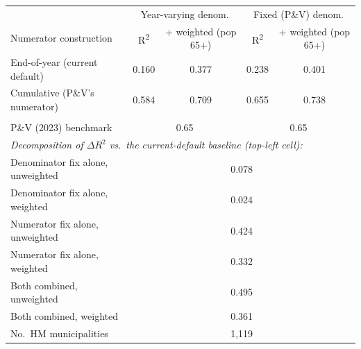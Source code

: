 \begin{tabular}{lcccc} \hline \hline
& \multicolumn{2}{c}{Year-varying denom.} & \multicolumn{2}{c}{Fixed (P\&V) denom.} \\
Numerator construction & R\textsuperscript{2} & + weighted (pop 65+) & R\textsuperscript{2} & + weighted (pop 65+) \\ \toprule
End-of-year (current default) & 0.160 & 0.377 & 0.238 & 0.401 \\ 
Cumulative (P\&V's numerator) & 0.584 & 0.709 & 0.655 & 0.738 \\ 
  & & & & \\ 
P\&V (2023) benchmark & \multicolumn{2}{c}{0.65} & \multicolumn{2}{c}{0.65} \\ 
\bottomrule
\multicolumn{5}{l}{\textit{Decomposition of $\Delta R^2$ vs.\ the current-default baseline (top-left cell):}} \\ 
\quad Denominator fix alone, unweighted & \multicolumn{4}{c}{0.078} \\ 
\quad Denominator fix alone, weighted & \multicolumn{4}{c}{0.024} \\ 
\quad Numerator fix alone, unweighted & \multicolumn{4}{c}{0.424} \\ 
\quad Numerator fix alone, weighted & \multicolumn{4}{c}{0.332} \\ 
\quad Both combined, unweighted & \multicolumn{4}{c}{0.495} \\ 
\quad Both combined, weighted & \multicolumn{4}{c}{0.361} \\ 
No.\ HM municipalities & \multicolumn{4}{c}{1,119} \\ 
\end{tabular}
